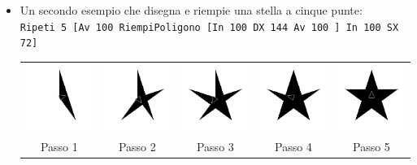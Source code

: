 \begin{itemize}
\begin{center}
	\end{center}
	\item Un secondo esempio che disegna e riempie una stella a cinque punte:\\
	\lstinline$Ripeti 5 [Av 100 RiempiPoligono [In 100 DX 144 Av 100 ] In 100 SX 72]$
	\begin{center}
		\begin{tabular}{ccccc}
			\includegraphics[width=3cm]{pics/fillpolygon1.png}& \includegraphics[width=3cm]{pics/fillpolygon2.png}& \includegraphics[width=3cm]{pics/fillpolygon3.png}& \includegraphics[width=3cm]{pics/fillpolygon4.png}& \includegraphics[width=3cm]{pics/fillpolygon5.png}\\
			Passo 1& Passo 2& Passo 3& Passo 4&Passo 5\\
		\end{tabular}
	\end{center}
\end{itemize}



